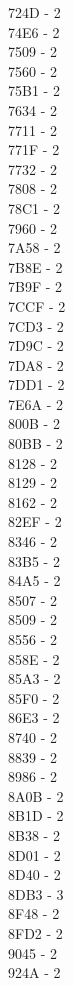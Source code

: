 \documentclass[10pt,letterpaper]{article}
\begin{document}
\begin{multicols}{5}
724D -  2\\
74E6 -  2\\
7509 -  2\\
7560 -  2\\
75B1 -  2\\
7634 -  2\\
7711 -  2\\
771F -  2\\
7732 -  2\\
7808 -  2\\
78C1 -  2\\
7960 -  2\\
7A58 -  2\\
7B8E -  2\\
7B9F -  2\\
7CCF -  2\\
7CD3 -  2\\
7D9C -  2\\
7DA8 -  2\\
7DD1 -  2\\
7E6A -  2\\
800B -  2\\
80BB -  2\\
8128 -  2\\
8129 -  2\\
8162 -  2\\
82EF -  2\\
8346 -  2\\
83B5 -  2\\
84A5 -  2\\
8507 -  2\\
8509 -  2\\
8556 -  2\\
858E -  2\\
85A3 -  2\\
85F0 -  2\\
86E3 -  2\\
8740 -  2\\
8839 -  2\\
8986 -  2\\
8A0B -  2\\
8B1D -  2\\
8B38 -  2\\
8D01 -  2\\
8D40 -  2\\
8DB3 -  3\\
8F48 -  2\\
8FD2 -  2\\
9045 -  2\\
924A -  2\\

\end{multicols}
\end{document}
